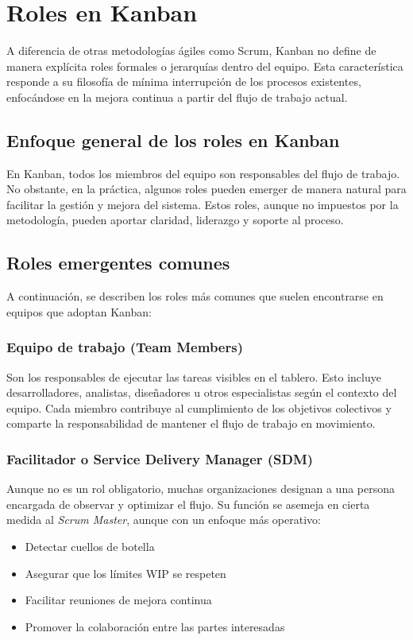 \section{Roles en Kanban}

A diferencia de otras metodologías ágiles como Scrum, Kanban no define de manera explícita roles formales o jerarquías dentro del equipo. Esta característica responde a su filosofía de mínima interrupción de los procesos existentes, enfocándose en la mejora continua a partir del flujo de trabajo actual.

\subsection{Enfoque general de los roles en Kanban}

En Kanban, todos los miembros del equipo son responsables del flujo de trabajo. No obstante, en la práctica, algunos roles pueden emerger de manera natural para facilitar la gestión y mejora del sistema. Estos roles, aunque no impuestos por la metodología, pueden aportar claridad, liderazgo y soporte al proceso.

\subsection{Roles emergentes comunes}

A continuación, se describen los roles más comunes que suelen encontrarse en equipos que adoptan Kanban:

\subsubsection{Equipo de trabajo (Team Members)}

Son los responsables de ejecutar las tareas visibles en el tablero. Esto incluye desarrolladores, analistas, diseñadores u otros especialistas según el contexto del equipo. Cada miembro contribuye al cumplimiento de los objetivos colectivos y comparte la responsabilidad de mantener el flujo de trabajo en movimiento.

\subsubsection{Facilitador o Service Delivery Manager (SDM)}

Aunque no es un rol obligatorio, muchas organizaciones designan a una persona encargada de observar y optimizar el flujo. Su función se asemeja en cierta medida al \textit{Scrum Master}, aunque con un enfoque más operativo:
\begin{itemize}
    \item Detectar cuellos de botella
    \item Asegurar que los límites WIP se respeten
    \item Facilitar reuniones de mejora continua
    \item Promover la colaboración entre las partes interesadas
\end{itemize}

